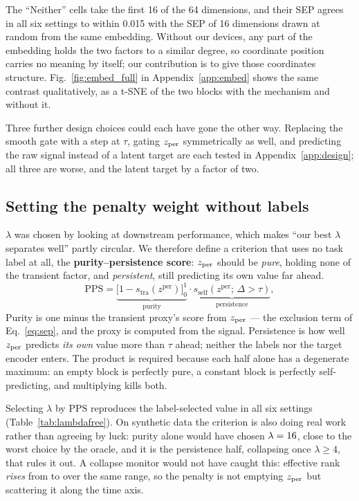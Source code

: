 The ``Neither'' cells take the first 16 of the 64 dimensions, and their SEP agrees in all six settings to within 0.015 with the SEP of 16 dimensions drawn at random from the same embedding. Without our devices, any part of the embedding holds the two factors to a similar degree, so coordinate position carries no meaning by itself; our contribution is to give those coordinates structure. Fig.~\ref{fig:embed_full} in Appendix~\ref{app:embed} shows the same contrast qualitatively, as a t-SNE of the two blocks with the mechanism and without it.

Three further design choices could each have gone the other way. Replacing the smooth gate with a step at $\tau$, gating $z_{\mathrm{per}}$ symmetrically as well, and predicting the raw signal instead of a latent target are each tested in Appendix~\ref{app:design}; all three are worse, and the latent target by a factor of two.

\subsection{Setting the penalty weight without labels}
\label{sec:lambdafree}

$\lambda$ was chosen by looking at downstream performance, which makes ``our best $\lambda$ separates well'' partly circular. We therefore define a criterion that uses no task label at all, the \textbf{purity--persistence score}: $z_{\mathrm{per}}$ should be \emph{pure}, holding none of the transient factor, and \emph{persistent}, still predicting its own value far ahead.
\begin{equation}
\mathrm{PPS} = \underbrace{\big[1-s_{\text{tra}}(z^{\mathrm{per}})\big]_0^1}_{\text{purity}} \cdot
    \underbrace{s_{\text{self}}(z^{\mathrm{per}};\,\Delta>\tau)}_{\text{persistence}},
\label{eq:pps}
\end{equation}
Purity is one minus the transient proxy's score from $z_{\mathrm{per}}$ --- the exclusion term of Eq.~\ref{eq:sep}, and the proxy is computed from the signal. Persistence is how well $z_{\mathrm{per}}$ predicts \emph{its own} value more than $\tau$ ahead; neither the labels nor the target encoder enters. The product is required because each half alone has a degenerate maximum: an empty block is perfectly pure, a constant block is perfectly self-predicting, and multiplying kills both.

Selecting $\lambda$ by $\mathrm{PPS}$ reproduces the label-selected value in all six settings (Table~\ref{tab:lambdafree}). On synthetic data the criterion is also doing real work rather than agreeing by luck: purity alone would have chosen $\lambda=16$, close to the worst choice by the oracle, and it is the persistence half, collapsing once $\lambda\ge4$, that rules it out. A collapse monitor would not have caught this: effective rank \emph{rises} from \numJrankLo{} to \numJrankHi{} over the same range, so the penalty is not emptying $z_{\mathrm{per}}$ but scattering it along the time axis.

